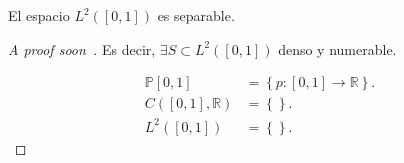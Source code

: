 \begin{frame}
	\begin{theorem}
		El espacio
		\begin{math}
			L^{2}\left(\left[0,1\right]\right)
		\end{math}
		es separable.
	\end{theorem}

	\begin{proof}[\alert{A proof soon}~\cite{Gaddy2016}]
		Es decir, $\exists S\subset L^{2}\left(\left[0,1\right]\right)$
		denso y numerable.

		\begin{align*}
			\mathds{P}\left[0,1\right]
			 & =
			\left\{
			p\colon\left[0,1\right]\to\mathds{R}
			\right\}. \\
			C\left(\left[0,1\right],\mathds{R}\right)
			 & =
			\left\{
			\right\}. \\
			L^{2}\left(\left[0,1\right]\right)
			 & =
			\left\{
			\right\}.
		\end{align*}
	\end{proof}
\end{frame}
